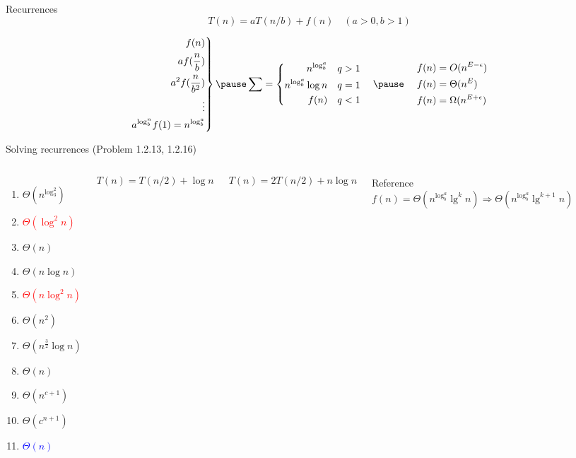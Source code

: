
\begin{frame}{Recurrences}
  \[
    T(n) = aT(n/b) + f(n) \quad (a > 0, b > 1)
  \]

  \begin{equation*}
    \left.\begin{aligned}
      f(n) \\
      af(\frac{n}{b}) \\
      a^2f(\frac{n}{b^2}) \\
      \vdots \\
      a^{\log_b^n}f(1) = n^{\log_b^a}
    \end{aligned}\right\}
    \pause
    \sum = \left\{\begin{aligned}
      n^{\log_b^a}	\quad & q > 1 \\
      n^{\log_b^a}\log n \quad & q = 1 \\
      f(n)	\quad & q < 1 \quad \\
    \end{aligned}\right.
    \pause
    \quad \left.\begin{aligned}
      f(n) &= O(n^{E-\epsilon}) \\
  f(n) &= \Theta(n^E) \\
  f(n) &= \Omega(n^{E+\epsilon}) 
    \end{aligned}\right.
  \end{equation*}
\end{frame}

\begin{frame}{Solving recurrences (Problem 1.2.13, 1.2.16)}
  \begin{columns}
      \begin{enumerate}
	\item $\Theta(n^{\log_3^2})$
	\item \textcolor{red}{$\Theta(\log^2 n)$}
	\item $\Theta(n)$
	\item $\Theta(n \log n)$
	\item \textcolor{red}{$\Theta(n \log^2 n)$}
	\item $\Theta(n^2)$
	\item $\Theta(n^{\frac{3}{2}}\log n)$
	\item $\Theta(n)$
	\item $\Theta(n^{c+1})$
	\item $\Theta(c^{n+1})$
	\item \textcolor{blue}{$\Theta(n)$}
      \end{enumerate}
      \[
	T(n) = T(n/2) + \log n
      \]

      \[
	T(n) = 2T(n/2) + n\log n
      \]

    \pause
    \begin{alertblock}{Reference}
      \[
	f(n) = \Theta(n^{\log_b^a} \lg^{k}n) \Rightarrow \Theta(n^{\log_b^a} \lg^{k+1}n)
      \]
    \end{alertblock}
  \end{columns}
\end{frame}


